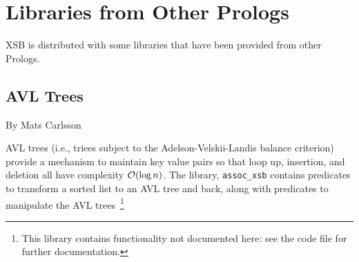 \chapter{Libraries from Other Prologs}

XSB is distributed with some libraries that have been provided from
other Prologs.

%
%
%
%
\section{AVL Trees}

By Mats Carlsson

AVL trees (i.e., triees subject to the Adelson-Velskii-Landis balance
criterion) provide a mechanism to maintain key value pairs so that
loop up, insertion, and deletion all have complexity ${\cal O}(\log
n)$.  The library, {\tt assoc\_xsb} contains predicates to transform a
sorted list to an AVL tree and back, along with predicates to
manipulate the AVL trees~\footnote{This library contains functionality
  not documented here: see the code file for further documentation.}

